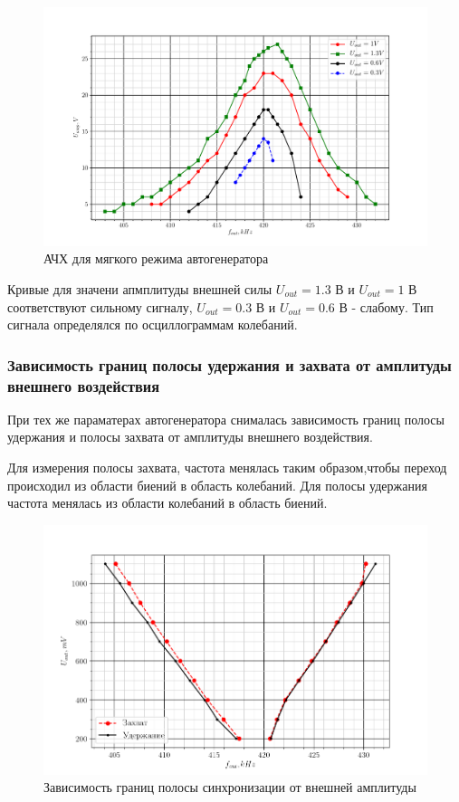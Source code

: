 \begin{figure}[H]
	\centering
	\includegraphics[width = .99\linewidth]{graphs/soft1.pdf}
	\caption{АЧХ для мягкого режима автогенератора}
	\label{fig:3}
\end{figure}

Кривые для значени апмплитуды внешней силы $U_{out} = 1.3$ В и $U_{out} = 1$ В соответствуют сильному сигналу, $U_{out}
= 0.3$ В и $U_{out} = 0.6$ В - слабому. Тип сигнала определялся по осциллограммам колебаний.

\subsubsection*{Зависимость границ полосы удержания и захвата от амплитуды внешнего воздействия}


При тех же параматерах автогенератора снималась зависимость границ полосы удержания и полосы захвата от амплитуды внешнего воздействия. 

Для измерения полосы захвата, частота менялась таким образом,чтобы переход происходил из области биений в область
колебаний. Для полосы удержания частота менялась из области колебаний в область биений.

\begin{figure}[H]
	\centering
	\includegraphics[width = .85\linewidth]{graphs/sync.png}
	\caption{Зависимость границ полосы синхронизации от внешней амплитуды}
	\label{fig:4}
\end{figure}

